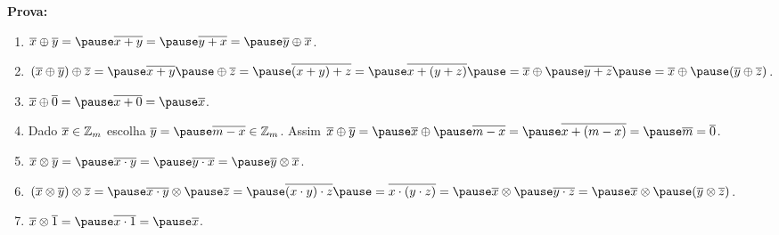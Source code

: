 \documentclass{beamer}
\begin{document}
    \begin{frame}
        \noindent \textbf{Prova: }
            \begin{enumerate}[label={\roman*})]
                \item $\overline{x} \oplus \overline{y} = \pause \overline{x + y} = \pause \overline{y + x} = \pause \overline{y} \oplus \overline{x}$. \vspace{.2cm} \pause
                
                \item $(\overline{x} \oplus \overline{y}) \oplus \overline{z} = \pause \overline{x + y} \pause \oplus \overline{z} = \pause \overline{(x + y) + z} = \pause \overline{x + (y + z)} \pause = \overline{x} \oplus \pause \overline{y + z}\pause  = \overline{x} \oplus \pause (\overline{y} \oplus \overline{z})$. \vspace{.2cm} \pause

                \item $\overline{x} \oplus \overline{0} = \pause \overline{x + 0} = \pause \overline{x}$. \vspace{.2cm} \pause

                \item Dado $\overline{x} \in \mathbb{Z}_m$ \pause escolha $\overline{y} = \pause \overline{m - x} \in \z_m$. \pause Assim $\overline{x} \oplus \overline{y} = \pause \overline{x} \oplus \pause \overline{m - x} = \pause \overline{x + (m - x)} = \pause \overline{m} = \overline{0}$. \vspace{.2cm} \pause

                \item $\overline{x} \otimes \overline{y} = \pause \overline{x \cdot y} = \pause \overline{y \cdot x} = \pause \overline{y} \otimes \overline{x}$. \vspace{.2cm} \pause

                \item $(\overline{x} \otimes \overline{y}) \otimes \overline{z} = \pause \overline{x \cdot y} \otimes \pause \overline{z} = \pause \overline{(x \cdot y)\cdot z} \pause = \overline{x\cdot(y \cdot z)} = \pause \overline{x} \otimes \pause \overline{y \cdot z} = \pause \overline{x} \otimes \pause (\overline{y}\otimes \overline{z})$. \vspace{.2cm} \pause

                \item $\overline{x} \otimes \overline{1} = \pause \overline{x \cdot 1} = \pause \overline{x}$. \pause
            \end{enumerate}
        \qedsymbol
    \end{frame}
\end{document}
